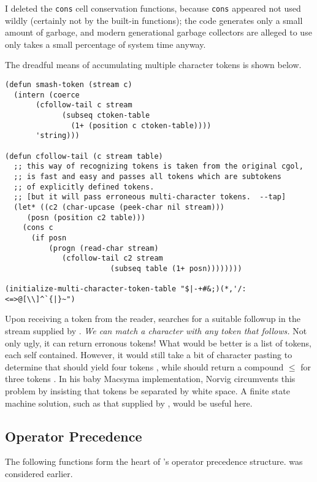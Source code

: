 I deleted the {\tt cons} cell conservation functions, because 
{\tt cons} appeared not used wildly
(certainly not by the built-in functions); the code generates only
a small amount of garbage, and modern generational garbage collectors 
are alleged to use only
takes a small percentage of system time anyway.

The dreadful means of accumulating multiple character tokens is shown below.

{\footnotesize\begin{verbatim}
(defun smash-token (stream c)
  (intern (coerce
	   (cfollow-tail c stream
             (subseq ctoken-table
               (1+ (position c ctoken-table))))
	   'string)))

(defun cfollow-tail (c stream table)
  ;; this way of recognizing tokens is taken from the original cgol,
  ;; is fast and easy and passes all tokens which are subtokens
  ;; of explicitly defined tokens.
  ;; [but it will pass erroneous multi-character tokens.  --tap]
  (let* ((c2 (char-upcase (peek-char nil stream)))
	 (posn (position c2 table)))
    (cons c
	  (if posn
	      (progn (read-char stream)
		     (cfollow-tail c2 stream
                        (subseq table (1+ posn))))))))

(initialize-multi-character-token-table "$|-+#&;)(*,'/:<=>@[\\]^`{|}~")
\end{verbatim}}

Upon receiving a token from the reader,  searches for a
suitable followup in the stream supplied by .  {\it We can
match a character with any token that follows.} Not only ugly, it
can return erronous tokens!  What would be better is a list of tokens, each
self contained.  However, it would still take a bit of character pasting to
determine that  should yield four tokens , while
 should return a compound $\leq$ for three tokens .
In his baby Macsyma implementation, Norvig \cite{norvig:para} circumvents
this problem by insisting that tokens be separated by white space.
A finite state machine solution, such as that supplied by , would
be useful here.


\subsection {Operator Precedence}

The following functions form the heart of \cgol's operator precedence structure.
 was considered earlier.

